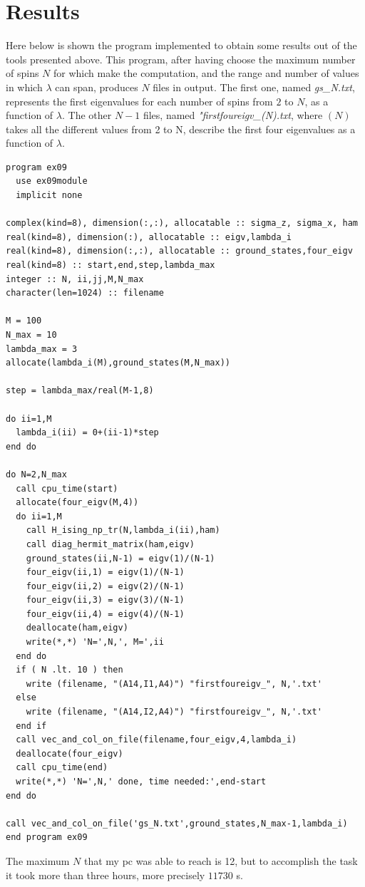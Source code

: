 \documentclass[prb,9pt,notitlepage]{revtex4-1}
\begin{document}
\section{Results}
Here below is shown the program implemented to obtain some results out of the tools presented above. This program, after having choose the  maximum number of spins $N$ for which make the computation, and the range and number of values in which $\lambda$ can span, produces $N$ files in output. The first one, named \textit{gs\_N.txt}, represents the first eigenvalues for each number of spins from $2$ to $N$, as a function of $\lambda$. The other $N-1$ files, named \textit{"firstfoureigv\_(N).txt}, where $(N)$ takes all the different values from 2 to N, describe the first four eigenvalues as a function of $\lambda$.
\begin{lstlisting}
program ex09
  use ex09module
  implicit none

complex(kind=8), dimension(:,:), allocatable :: sigma_z, sigma_x, ham
real(kind=8), dimension(:), allocatable :: eigv,lambda_i
real(kind=8), dimension(:,:), allocatable :: ground_states,four_eigv
real(kind=8) :: start,end,step,lambda_max
integer :: N, ii,jj,M,N_max
character(len=1024) :: filename

M = 100
N_max = 10
lambda_max = 3
allocate(lambda_i(M),ground_states(M,N_max))

step = lambda_max/real(M-1,8)

do ii=1,M
  lambda_i(ii) = 0+(ii-1)*step
end do

do N=2,N_max
  call cpu_time(start)
  allocate(four_eigv(M,4))
  do ii=1,M
    call H_ising_np_tr(N,lambda_i(ii),ham)
    call diag_hermit_matrix(ham,eigv)
    ground_states(ii,N-1) = eigv(1)/(N-1)
    four_eigv(ii,1) = eigv(1)/(N-1)
    four_eigv(ii,2) = eigv(2)/(N-1)
    four_eigv(ii,3) = eigv(3)/(N-1)
    four_eigv(ii,4) = eigv(4)/(N-1)
    deallocate(ham,eigv)
    write(*,*) 'N=',N,', M=',ii
  end do
  if ( N .lt. 10 ) then
    write (filename, "(A14,I1,A4)") "firstfoureigv_", N,'.txt'
  else
    write (filename, "(A14,I2,A4)") "firstfoureigv_", N,'.txt'
  end if
  call vec_and_col_on_file(filename,four_eigv,4,lambda_i)
  deallocate(four_eigv)
  call cpu_time(end)
  write(*,*) 'N=',N,' done, time needed:',end-start
end do

call vec_and_col_on_file('gs_N.txt',ground_states,N_max-1,lambda_i)
end program ex09
\end{lstlisting}
The maximum $N$ that my pc was able to reach is 12, but to accomplish the task it took more than three hours, more precisely $11730$ s.
\end{document}
